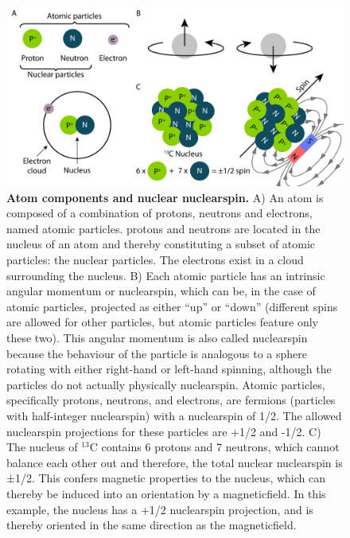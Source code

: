 

\begin{figure}[tbh!]
    \centering
    \includegraphics[width=1\linewidth]{figures/spin_nucleous.pdf}
    \caption{\textbf{Atom components and nuclear \gls{nuclearspin}.} A) An atom is composed of a combination of \glspl{proton}, \glspl{neutron} and \glspl{electron}, named atomic particles. \Glspl{proton} and \glspl{neutron} are located in the \gls{nucleus} of an atom and thereby constituting a subset of atomic particles: the nuclear particles. The \glspl{electron} exist in a cloud surrounding the \gls{nucleus}. B) Each atomic particle has an intrinsic angular momentum or \gls{nuclearspin}, which can be, in the case of atomic particles, projected as either ``up'' or ``down'' (different spins are allowed for other particles, but atomic particles feature only these two). This angular momentum is also called \gls{nuclearspin} because the behaviour of the particle is analogous to a sphere rotating with either right-hand or left-hand spinning, although the particles do not actually physically \gls{nuclearspin}. Atomic particles, specifically \glspl{proton}, \glspl{neutron}, and \glspl{electron}, are fermions (particles with half-integer \gls{nuclearspin}) with a \gls{nuclearspin} of 1/2. The allowed \gls{nuclearspin} projections for these particles are +1/2 and -1/2. C) The \gls{nucleus} of $^{13}\text{C}$ contains 6 \glspl{proton} and 7 \glspl{neutron}, which cannot balance each other out and therefore, the total nuclear \gls{nuclearspin} is ±1/2. This confers magnetic properties to the \gls{nucleus}, which can thereby be induced into an orientation by a \gls{magneticfield}. In this example, the \gls{nucleus} has a +1/2 \gls{nuclearspin} projection, and is thereby oriented in the same direction as the \gls{magneticfield}. 
    }
    \label{fig:chapter1:atom}
\end{figure}

